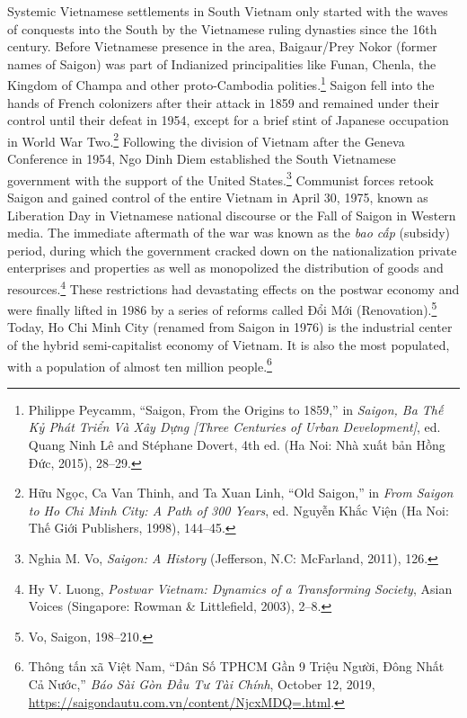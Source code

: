 Systemic Vietnamese settlements in South Vietnam only started with the waves of conquests into the South by the Vietnamese ruling dynasties since the 16th century. Before Vietnamese presence in the area, Baigaur/Prey Nokor (former names of Saigon) was part of Indianized principalities like Funan, Chenla, the Kingdom of Champa and other proto-Cambodia polities.\footnote{Philippe Peycamm, “Saigon, From the Origins to 1859,” in \textit{Saigon, Ba Thế Kỷ Phát Triển Và Xây Dựng [Three Centuries of Urban Development]}, ed. Quang Ninh Lê and Stéphane Dovert, 4th ed. (Ha Noi: Nhà xuất bản Hồng Đức, 2015), 28–29.} Saigon fell into the hands of French colonizers after their attack in 1859 and remained under their control until their defeat in 1954, except for a brief stint of Japanese occupation in World War Two.\footnote{Hữu Ngọc, Ca Van Thinh, and Ta Xuan Linh, “Old Saigon,” in \textit{From Saigon to Ho Chi Minh City: A Path of 300 Years}, ed. Nguyễn Khắc Viện (Ha Noi: Thế Giới Publishers, 1998), 144–45.} Following the division of Vietnam after the Geneva Conference in 1954, Ngo Dinh Diem established the South Vietnamese government with the support of the United States.\footnote{Nghia M. Vo, \textit{Saigon: A History} (Jefferson, N.C: McFarland, 2011), 126.} Communist forces retook Saigon and gained control of the entire Vietnam in April 30, 1975, known as Liberation Day in Vietnamese national discourse or the Fall of Saigon in Western media. The immediate aftermath of the war was known as the \textit{bao cấp} (subsidy) period, during which the government cracked down on the nationalization private enterprises and properties as well as monopolized the distribution of goods and resources.\footnote{Hy V. Luong, \textit{Postwar Vietnam: Dynamics of a Transforming Society}, Asian Voices (Singapore: Rowman \& Littlefield, 2003), 2–8.} These restrictions had devastating effects on the postwar economy and were finally lifted in 1986 by a series of reforms called Đổi Mới (Renovation).\footnote{Vo, Saigon, 198–210.} Today, Ho Chi Minh City (renamed from Saigon in 1976) is the industrial center of the hybrid semi-capitalist economy of Vietnam. It is also the most populated, with a population of almost ten million people.\footnote{Thông tấn xã Việt Nam, “Dân Số TPHCM Gần 9 Triệu Người, Đông Nhất Cả Nước,” \textit{Báo Sài Gòn Đầu Tư Tài Chính}, October 12, 2019, \url{https://saigondautu.com.vn/content/NjcxMDQ=.html}.} 

